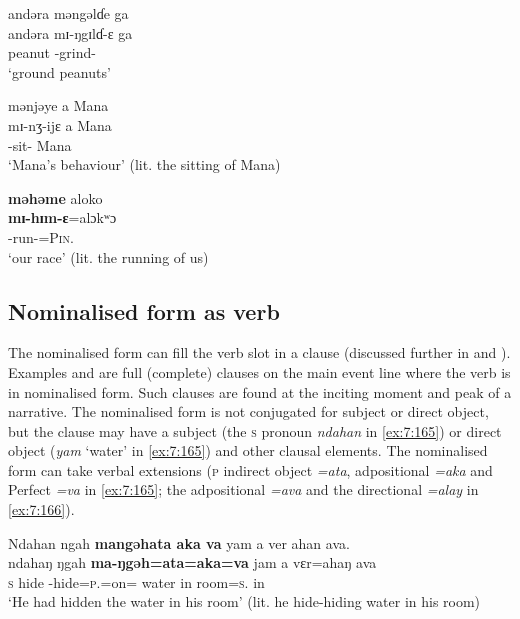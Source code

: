 \ea\label{ex:7:162}
andəra  məngəlɗe  ga\\
\gll  andəra  mɪ-ŋgɪlɗ-ɛ    ga\\
      peanut   {\NOM}{}-grind-{\CL}    {\ADJ}\\
\glt  ‘ground peanuts’\\
\z 

\ea\label{ex:7:163}
mənjəye  a  Mana\\
\gll  mɪ-nʒ-ijɛ     a   Mana\\
      {\NOM}{}-sit-{\CL}    {\GEN}  Mana\\
\glt  ‘Mana’s behaviour’ (lit. the sitting of Mana)\\
\z 

\ea\label{ex:7:164}
\textbf{məhəme}  aloko\\
\gll  \textbf{mɪ-hɪm-ɛ}=alɔkʷɔ\\
      {\NOM}{}-run-{\CL}=\textsc{Pin}.{\POSS}\\
\glt  ‘our race’ (lit. the running of us)\\
\z 

\subsection{Nominalised form as verb}\label{sec:7.6.2}
\hypertarget{RefHeading1212441525720847}{}
The nominalised form can fill the verb slot in a clause (discussed further in  and ). Examples  and  are full (complete) clauses on the main event line where the verb is in nominalised form. Such clauses are found at the inciting moment and peak of a narrative.  The nominalised form is not conjugated for subject or direct object, but the clause may have a subject (the \textsc{s} pronoun \textit{ndahan} in \ref{ex:7:165}) or direct object (\textit{yam} ‘water’ in \ref{ex:7:165}) and other clausal elements. The nominalised form can take verbal extensions (\textsc{p} indirect object \textit{=ata}, adpositional \textit{=aka} and Perfect \textit{=va} in \ref{ex:7:165}; the adpositional \textit{=ava} and the directional \textit{=alay} in \ref{ex:7:166}). 

\ea\label{ex:7:165}
Ndahan  ngah \textbf{mangəhata  aka  va}  yam  a  ver  ahan  ava.\\
\gll  ndahaŋ  ŋgah \textbf{ma-ŋgəh=ata=aka=va}  jam  a  vɛr=ahaŋ    ava\\
      \textsc{s}    hide  {\NOM}{}-hide=\textsc{p}.{\IO}=on={\PRF}  water  in  room=\textsc{s}.{\POSS}  in\\
\glt  ‘He had hidden the water in his room’ (lit. he hide-hiding water in his room)\\
\z 


